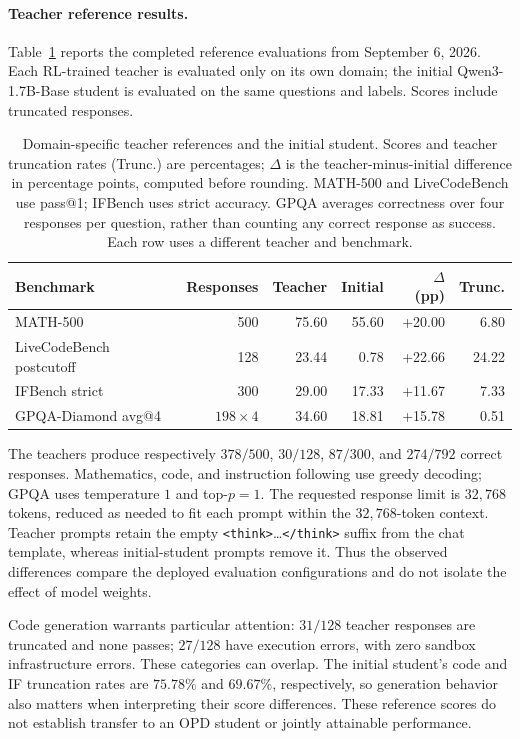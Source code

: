 \paragraph{Teacher reference results.}
Table~\ref{tab:teacher_reference} reports the completed reference evaluations
from September 6, 2026. Each RL-trained teacher is evaluated only on its
own domain; the initial Qwen3-1.7B-Base student is evaluated on the same
questions and labels. Scores include truncated responses.

\begin{table}[htbp]
\centering
\small
\setlength{\tabcolsep}{4pt}
\begin{tabular}{lrrrrr}
\toprule
Benchmark & Responses & Teacher & Initial & $\Delta$ (pp) & Trunc. \\
\midrule
MATH-500 & 500 & 75.60 & 55.60 & +20.00 & 6.80 \\
LiveCodeBench postcutoff & 128 & 23.44 & 0.78 & +22.66 & 24.22 \\
IFBench strict & 300 & 29.00 & 17.33 & +11.67 & 7.33 \\
GPQA-Diamond avg@4 & $198\times4$ & 34.60 & 18.81 & +15.78 & 0.51 \\
\bottomrule
\end{tabular}
\caption{Domain-specific teacher references and the initial student.
Scores and teacher truncation rates (Trunc.) are percentages;
$\Delta$ is the teacher-minus-initial difference in percentage points,
computed before rounding. MATH-500 and LiveCodeBench use pass@1;
IFBench uses strict accuracy. GPQA averages correctness over four
responses per question, rather than counting any correct response as
success. Each row uses a different teacher and benchmark.}
\label{tab:teacher_reference}
\end{table}

The teachers produce respectively $378/500$, $30/128$, $87/300$, and
$274/792$ correct responses. Mathematics, code, and instruction following
use greedy decoding; GPQA uses temperature $1$ and top-$p=1$.
The requested response limit is $32{,}768$ tokens, reduced as needed to
fit each prompt within the $32{,}768$-token context.
Teacher prompts retain the empty \texttt{<think>}\ldots\texttt{</think>}
suffix from the chat template, whereas initial-student prompts remove
it. Thus the observed differences compare the deployed evaluation
configurations and do not isolate the effect of model weights.

Code generation warrants particular attention: $31/128$ teacher responses
are truncated and none passes; $27/128$ have execution errors, with zero
sandbox infrastructure errors. These categories can overlap.
The initial student's code and IF truncation rates are $75.78\%$ and
$69.67\%$, respectively, so generation behavior also matters when
interpreting their score differences. These reference scores do not
establish transfer to an OPD student or jointly attainable performance.

